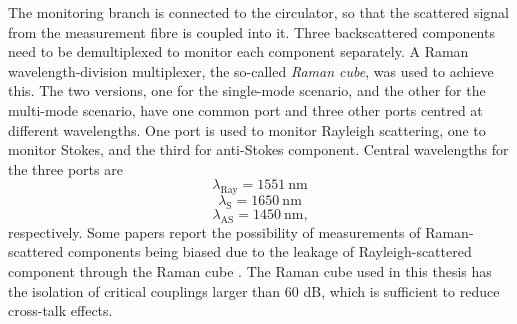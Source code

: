 \documentclass{standalone}
\begin{document}
The monitoring branch is connected to the circulator, so that the scattered signal from the measurement fibre is coupled into it. Three backscattered components need to be demultiplexed to monitor each component separately. A Raman wavelength-division multiplexer, the so-called \textit{Raman cube}, was used to achieve this. The two versions, one for the single-mode scenario, and the other for the multi-mode scenario, have one common port and three other ports centred at different wavelengths. One port is used to monitor Rayleigh scattering, one to monitor Stokes, and the third for anti-Stokes component. Central wavelengths for the three ports are
\begin{equation}
\lambda_\textrm{Ray} = \SI{1551}{\nano \meter}
\end{equation}
\begin{equation}
\lambda_\textrm{S} = \SI{1650}{\nano \meter}
\end{equation}
\begin{equation}
\lambda_\textrm{AS} = \SI{1450}{\nano \meter} \textrm{,}
\end{equation}
respectively. Some papers report the possibility of measurements of Raman-scattered components being biased due to the leakage of Rayleigh-scattered component through the Raman cube \cite{rayleigh_leakage1}\cite{rayleigh_leakage2}. The Raman cube used in this thesis has the isolation of critical couplings larger than 60 dB, which is sufficient to reduce cross-talk effects. \\
\end{document}
